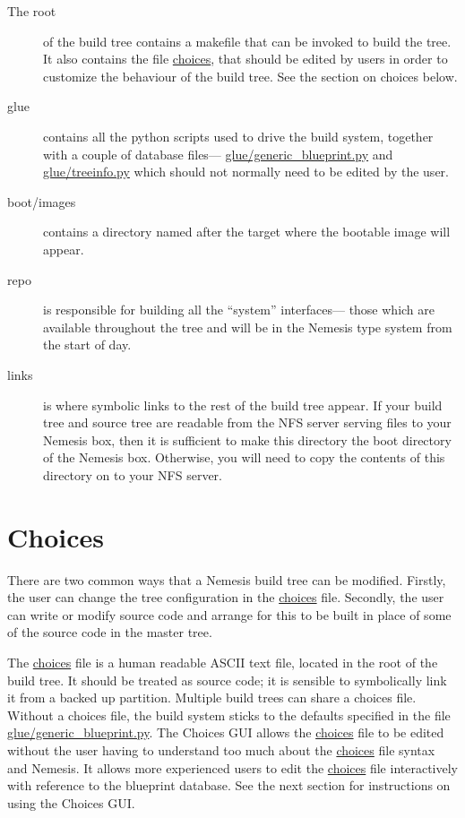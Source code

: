 \documentclass[a4paper]{article}
\begin{document}
\begin{description}
\item[The root] of the build tree contains a makefile that can be
invoked to build the tree. It also contains the file \url{choices},
that should be edited by users in order to customize the behaviour of
the build tree. See the section on choices below. 

\item[glue] contains all the python scripts used to drive the build
system, together with a couple of database files---%
\url{glue/generic_blueprint.py} and \url{glue/treeinfo.py} which
should not normally need to be edited by the user.

\item[boot/images] contains a directory named after the target where
the bootable image will appear.

\item[repo] is responsible for building all the ``system'' interfaces---%
those which are available throughout the tree and will be in the
Nemesis type system from the start of day.

\item[links] is where symbolic links to the rest of the build tree
appear. If your build tree and source tree are readable from the NFS
server serving files to your Nemesis box, then it is sufficient to
make this directory the boot directory of the Nemesis box. Otherwise,
you will need to copy the contents of this directory on to your NFS server.
\end{description}

\section{Choices}

There are two common ways that a Nemesis build tree can be
modified. Firstly, the user can change the tree configuration in the
\url{choices} file. Secondly, the user can write or modify source code
and arrange for this to be built in place of some of the source code
in the master tree.

The \url{choices} file is a human readable ASCII text file, located in the
root of the build tree. It should be treated as source code; it is
sensible to symbolically link it from a backed up partition.
Multiple build trees can share a choices file. Without
a choices file, the build system sticks to the defaults specified in
the file \url{glue/generic_blueprint.py}. The Choices GUI allows the
\url{choices} file to be edited without the user having to understand too
much about the \url{choices} file syntax and Nemesis. It allows more
experienced users to edit the \url{choices} file interactively with
reference to the blueprint database. See the next section for
instructions on using the Choices GUI.
\end{document}
